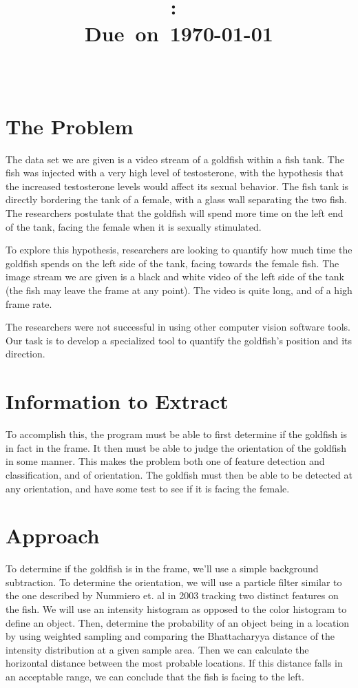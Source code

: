 \documentclass[english]{report}
\title{\vspace{2in}\textmd{\textbf{\hmwkClass:\
\hmwkTitle}}\\\normalsize\vspace{0.1in}\small{Due\ on\
\today}\\\vspace{0.1in}\large{\textit{\classInstructor\ }}\vspace{3in}}
\date{}
\author{\textbf{\authorName}}
\begin{document}
\begin{spacing}{1.1}


\section{The Problem}

The data set we are given is a video stream of a goldfish within a fish
tank. The fish was injected with a very high level of testosterone, with
the hypothesis that the increased testosterone levels would affect its
sexual behavior. The fish tank is directly bordering the tank of a
female, with a glass wall separating the two fish. The researchers
postulate that the goldfish will spend more time on the left end of the
tank, facing the female when it is sexually stimulated.

To explore this hypothesis, researchers are looking to quantify how much
time the goldfish spends on the left side of the tank, facing towards
the female fish. The image stream we are given is a black and white
video of the left side of the tank (the fish may leave the frame at any
point). The video is quite long, and of a high frame rate.

The researchers were not successful in using other computer vision
software tools. Our task is to develop a specialized tool to quantify
the goldfish's position and its direction.

\section{Information to Extract}

To accomplish this, the program must be able to first determine if the
goldfish is in fact in the frame. It then must be able to judge the
orientation of the goldfish in some manner. This makes the problem both
one of feature detection and classification, and of orientation. The
goldfish must then be able to be detected at any orientation, and have
some test to see if it is facing the female.

\section{Approach}

To determine if the goldfish is in the frame, we'll use a simple
background subtraction. To determine the orientation, we will use a
particle filter similar to the one described by Nummiero et. al in 2003
tracking two distinct features on the fish. We will use an intensity histogram
as opposed to the color histogram to define an object. Then, determine
the probability of an object being in a location by using weighted
sampling and comparing the Bhattacharyya distance of the intensity
distribution at a given sample area. Then we can calculate the
horizontal distance between the most probable locations. If this
distance falls in an acceptable range, we can conclude that the fish is
facing to the left.


\end{spacing}
\end{document}
